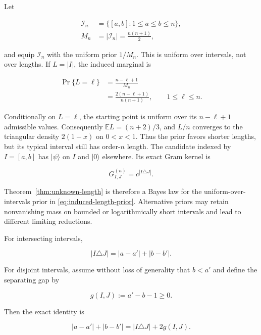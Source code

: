 Let

\begin{align*}
\mathcal I_n&=\{[a,b]:1\le a\le b\le n\}, \\
M_n&=|\mathcal I_n|=\frac{n(n+1)}2,
\end{align*}

and equip \(\mathcal I_n\) with the uniform prior \(1/M_n\). This is uniform
over intervals, not over lengths. If \(L=|I|\), the induced marginal is

\begin{equation}\label{eq:induced-length-prior}
\begin{aligned}
\Pr\{L=\ell\}
&=\frac{n-\ell+1}{M_n}\\
&=\frac{2(n-\ell+1)}{n(n+1)},
\qquad 1\leq\ell\leq n.
\end{aligned}
\end{equation}

Conditionally on \(L=\ell\), the starting point is uniform over its
\(n-\ell+1\) admissible values. Consequently
\(\mathbb E L=(n+2)/3\), and \(L/n\) converges to the triangular density
\(2(1-x)\) on \(0<x<1\). Thus the prior favors shorter lengths, but its
typical interval still has order-\(n\) length. The candidate indexed by
\(I=[a,b]\) has \(|\psi\rangle\) on \(I\) and \(|0\rangle\) elsewhere. Its
exact Gram kernel is

\begin{equation}\label{eq:interval-gram}
G^{(n)}_{I,J}=c^{|I\triangle J|}.
\end{equation}

Theorem~\ref{thm:unknown-length} is therefore a Bayes law for the
uniform-over-intervals prior in \eqref{eq:induced-length-prior}. Alternative
priors may retain nonvanishing mass on bounded or logarithmically short
intervals and lead to different limiting reductions.

For intersecting intervals,

\begin{equation}\label{eq:intersecting-distance}
|I\triangle J|=|a-a'|+|b-b'|.
\end{equation}

For disjoint intervals, assume without loss of generality that \(b<a'\) and define the separating gap by

\[
g(I,J):=a'-b-1\ge0.
\]

Then the exact identity is

\begin{equation}\label{eq:disjoint-distance}
|a-a'|+|b-b'|=|I\triangle J|+2g(I,J).
\end{equation}

